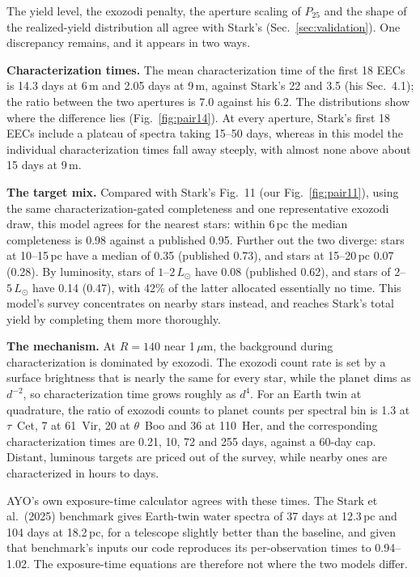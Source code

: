 \documentclass[11pt,a4paper]{article}
\begin{document}
The yield level, the exozodi penalty, the aperture scaling of $P_{25}$ and the shape of the
realized-yield distribution all agree with Stark's (Sec.~\ref{sec:validation}). One discrepancy
remains, and it appears in two ways.

\textbf{Characterization times.} The mean characterization time of the first 18 EECs is
14.3 days at 6\,m and 2.05 days at 9\,m, against Stark's 22 and 3.5 (his
Sec.~4.1); the ratio between the two apertures is 7.0 against his 6.2. The distributions
show where the difference lies (Fig.~\ref{fig:pair14}). At every aperture, Stark's first 18 EECs
include a plateau of spectra taking 15--50 days, whereas in this model the individual
characterization times fall away steeply, with almost none above about 15 days at 9\,m.

\textbf{The target mix.} Compared with Stark's Fig.~11 (our Fig.~\ref{fig:pair11}), using the same
characterization-gated completeness and one representative exozodi draw, this model agrees for the
nearest stars: within 6\,pc the median completeness is 0.98 against a published
0.95. Further out the two diverge: stars at 10--15\,pc have a median of 0.35
(published 0.73), and stars at 15--20\,pc 0.07 (0.28). By luminosity, stars
of $1$--$2\,L_\odot$ have 0.08 (published 0.62), and stars of $2$--$5\,L_\odot$ have
0.14 (0.47), with 42\% of the latter allocated essentially no time. This
model's survey concentrates on nearby stars instead, and reaches Stark's total yield by completing
them more thoroughly.

\textbf{The mechanism.} At $R = 140$ near 1\,$\mu$m, the background during characterization is
dominated by exozodi. The exozodi count rate is set by a surface brightness that is nearly the same
for every star, while the planet dims as $d^{-2}$, so characterization time grows roughly as $d^4$.
For an Earth twin at quadrature, the ratio of exozodi counts to planet counts per spectral bin is
1.3 at $\tau$~Cet, 7 at 61~Vir, 20 at $\theta$~Boo and 36 at
110~Her, and the corresponding characterization times are 0.21, 10,
72 and 255 days, against a 60-day cap. Distant, luminous targets are priced out
of the survey, while nearby ones are characterized in hours to days.

AYO's own exposure-time calculator agrees with these times. The Stark et al.\ (2025) benchmark
gives Earth-twin water spectra of 37 days at 12.3\,pc and 104 days at 18.2\,pc, for a telescope
slightly better than the baseline, and given that benchmark's inputs our code reproduces its
per-observation times to 0.94--1.02. The exposure-time equations are therefore not where the two
models differ.
\end{document}
